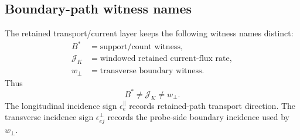 \subsection{Boundary-path witness names}
\label{man:boundary-path-witness-names}

The retained transport/current layer keeps the following witness names distinct:
\[
\begin{aligned}
B^* &= \text{support/count witness},\\
\mathcal J_K &= \text{windowed retained current-flux rate},\\
w_\perp &= \text{transverse boundary witness}.
\end{aligned}
\]
Thus
\[
\boxed{B^*\neq \mathcal J_K\neq w_\perp}.
\]
The longitudinal incidence sign \(\epsilon_e^{\parallel}\) records retained-path transport direction. The transverse incidence sign \(\epsilon_{ej}^{\perp}\) records the probe-side boundary incidence used by \(w_\perp\).
